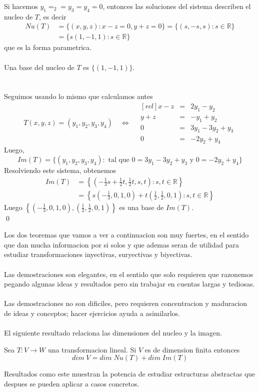 \documentclass{article}
\theoremstyle{definition}
\theoremstyle{definition}
\theoremstyle{remark}
\begin{document}
Si hacemos $y_1 = _2 = y_3 = y_4 = 0$, entonces las soluciones del sistema describen el nucleo de $T$, es decir \[
  \begin{aligned}
    Nu(T) &= \{(x,y,z): x-z=0,y+z=0\}=\{(s,-s,s) : s \in \mathbb{R}\} \\
          &= \{s (1,-1,1) : s \in \mathbb{R}\}
  \end{aligned}
\]
que es la forma parametrica. \\ \\ Una base del nucleo de $T$ es $\{(1,-1,1)\}$. \\\\\\ Seguimos usando lo mismo que calculamos antes \[
  T(x,y,z)=(y_1,y_2,y_3,y_4) \quad \Leftrightarrow \quad \begin{matrix}[rcl]
    x-z & = & 2y_1 - y_2 \\
    y+z & = & -y_1 + y_2 \\
    0 & = & 3y_1 -3y_2 + y_3 \\
    0 & = & -2y_2 + y_4 
  \end{matrix}
\]
Luego, \[
  Im(T)=\{(y_1,y_2,y_3,y_4) : \text{ tal que }0=3y_1-3y_2+y_3 \text{ y } 0=-2y_2+y_4\}
\]
Resolviendo este sistema, obtenemos \[
  \begin{aligned}
  Im(T) &= \left\{\left(-\frac{1}{3}s+\frac{1}{2}t,\frac{1}{2}t,s,t\right) : s,t \in \mathbb{R}\right\} \\
        &= \left\{s\left(-\frac{1}{3},0,1,0\right)+t\left(\frac{1}{2},\frac{1}{2},0,1\right) : s,t \in \mathbb{R}\right\}
\end{aligned}
\]
Luego $\left\{ \left(-\frac{1}{3},0,1,0\right),\left(\frac{1}{2},\frac{1}{2},0,1\right)\right\}$ es una base de $Im(T).$ \\ \qed
\pagebreak

Los dos teoremas que vamos a ver a continuacion son muy fuertes, en el sentido que dan mucha informacion por si solos y que ademas seran de utilidad para estudiar transformaciones inyectivas, suryectivas y biyectivas. \\\\ Las demostraciones son elegantes, en el sentido que solo requieren que razonemos pegando algunas ideas y resultados pero sin trabajar en cuentas largas y tediosas. \\\\ Las demostraciones no son dificiles, pero requieren concentracion y maduracion de ideas y conceptos; hacer ejercicios ayuda a asimilarlos.\\\\
El siguiente resultado relaciona las dimensiones del nucleo y la imagen. \begin{teo}
  Sea $T : V \to W$ una transformacion lineal. Si $V$ es de dimension finita entonces \[
dim\;V=dim\; Nu(T)+dim\; Im(T)
  \]
\end{teo}
  Resultados como este muestran la potencia de estudiar estructuras abstractas que despues se pueden aplicar a casos concretos.
\end{document}
